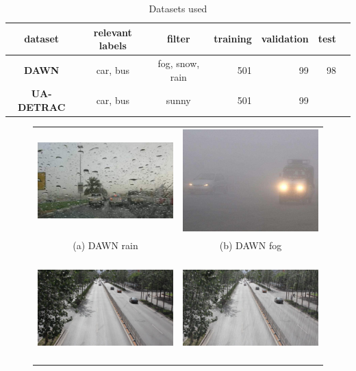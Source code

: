 \documentclass[]{article}
\begin{document}
\begin{table}[H]
	\centering
	\begin{tabular}{cccrrrp{1.5in}}
		\toprule
		\textbf{dataset} & \textbf{relevant labels} & \textbf{filter} & \textbf{training} & \textbf{validation} & \textbf{test} \\
		\midrule
		\textbf{DAWN} & car, bus & fog, snow, rain & 501 & 99 & 98  \\
		\textbf{UA-DETRAC} & car, bus & sunny &  501 & 99 &  \\
		\bottomrule
	\end{tabular}
	\caption{Datasets used}
	\label{table:datasets}
\end{table}

\begin{figure}
	\begin{tabular}{cc}
		\includegraphics[width=65mm, height=40mm]{dawn-train-fullres.png} &   \includegraphics[width=65mm, height=40mm]{dawn-fog.jpg} \\
		(a) DAWN rain & (b) DAWN fog  \\[6pt]
		\includegraphics[width=65mm, height=40mm]{detrac-orig.jpg} &   \includegraphics[width=65mm, height=40mm]{detrac-rain-fullres.png} \\

\end{tabular}
\end{figure}
\end{document}
